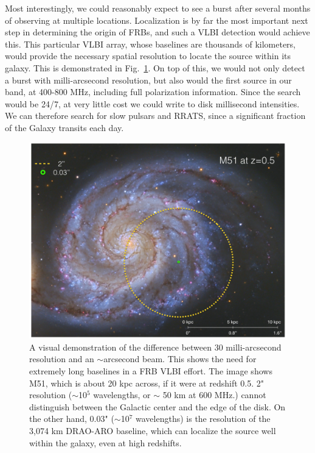 Most interestingly, 
we could reasonably expect to see a burst after several months of 
observing at multiple locations. Localization is by far the most 
important next step in determining the origin of FRBs, and 
such a VLBI detection would achieve this. This particular VLBI 
array, whose baselines are thousands of kilometers, would provide 
the necessary spatial resolution to locate the source 
within its galaxy. This is demonstrated in Fig.~\ref{fig-m51}.
On top of this, we would not only detect a burst with milli-arcsecond resolution,
but also would the first source in our band, at 400-800 MHz, 
including full polarization information. Since the search 
would be 24/7, at very little cost we could write to disk 
millisecond intensities. We can therefore search for slow pulsars 
and RRATS, since a significant fraction of the Galaxy transits each day.

\begin{figure}[!h]
\label{fig-m51}
\begin{center}
\includegraphics[trim={0in, 0in, 0in, 0in}, width=\textwidth]{./figures/beamforming/m51green.jpeg}
\caption[abc]{A visual demonstration of the difference between 
     30 milli-arcsecond resolution and an $\sim$arcsecond beam.
     This shows the need for extremely long baselines 
     in a FRB VLBI effort.
     The image shows M51, which is about 20 kpc across, if it
     were at redshift 0.5. 2" resolution ($\sim$10$^5$ wavelengths, or $\sim$
     50 km at 600 MHz.) cannot distinguish between the 
     Galactic center and the edge of the disk. On the other hand,
     0.03" ($\sim$10$^7$ wavelengths)
     is the resolution of the 3,074 km DRAO-ARO baseline,  
     which can localize the source well within the galaxy, even at 
     high redshifts.}  
\end{center}
\end{figure}

